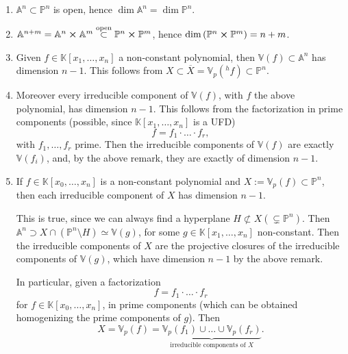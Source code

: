 \begin{rem}\leavevmode\vspace{-.2\baselineskip}
	\begin{enumerate}
		\item $\mathbb{A}^{n} \subset \mathbb{P}^{n}$ is open, hence $\dim \mathbb{A}^{n} = \dim \mathbb{P}^{n}$.
		\item $\mathbb{A}^{n+m} = \mathbb{A}^{n} \cross \mathbb{A}^{m} \stackrel{\text{open}}{\subset} 
			\mathbb{P}^{n} \cross \mathbb{P}^{m}$, hence
			$\dim \left( \mathbb{P}^{n} \cross \mathbb{P}^{m} \right) = n + m$.
		\item Given $f \in \mathbb{K}\left[x_1, \ldots, x_n \right]$ a non-constant polynomial,
			then $\mathbb{V}\left( f \right) \subset \mathbb{A}^{n}$ has dimension $n-1$.
			This follows from $X \subset \overline{X} = \mathbb{V}_p\left( {}^hf \right) \subset \mathbb{P}^{n}$.
		\item Moreover every irreducible component of $\mathbb{V}\left( f \right)$,
			with $f$ the above polynomial, has dimension $n-1$.
			This follows from the factorization in prime components
			(possible, since $\mathbb{K}\left[x_1, \ldots, x_n \right]$ is a UFD)
			\begin{equation}
			f = f_1 \cdot \ldots \cdot f_r
			,\end{equation} 
			with $f_1, \ldots, f_r$ prime.
			Then the irreducible components of $\mathbb{V}\left( f \right)$ are exactly $\mathbb{V}\left( f_i \right)$,
			and, by the above remark, they are exactly of dimension $n-1$.
		\item If $f \in \mathbb{K}\left[x_0, \ldots, x_n \right]$ is a non-constant polynomial 
			and $X := \mathbb{V}_p\left( f \right) \subset \mathbb{P}^{n}$,
			then each irreducible component of $X$ has dimension $n-1$.

			This is true, since we can always find a hyperplane 
			$H \not\subset X ( \subsetneq \mathbb{P}^{n})$.
			Then $\mathbb{A}^{n}\supset X \cap \left( \mathbb{P}^{n} \setminus H \right) \simeq
			\mathbb{V}\left( g \right)$, for some $g \in \mathbb{K}\left[x_1, \ldots, x_n \right]$ non-constant.
			Then the irreducible components of $X$ are the projective closures of the irreducible components
			of $\mathbb{V}\left( g \right)$, which have dimension $n-1$ by the above remark.

			In particular, given a factorization
			\begin{equation}
			f = f_1 \cdot \ldots \cdot f_r
			\end{equation} 
			for $f \in \mathbb{K}\left[x_0, \ldots, x_n \right]$, in prime components
			(which can be obtained homogenizing the prime components of $g$).
			Then
			\begin{equation}
			X = \mathbb{V}_p\left( f \right) =
			\underbrace{\mathbb{V}_p\left( f_1 \right) \cup \ldots \cup \mathbb{V}_p\left( f_r \right)}_{\text{irreducible components of } X}
			.\end{equation} 
	\end{enumerate}
\end{rem}

